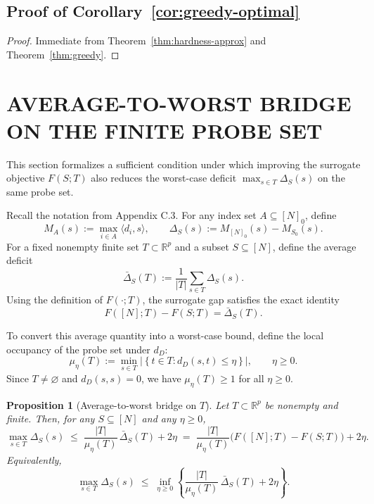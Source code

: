 \documentclass[accepted]{uai2026}
\theoremstyle{plain}
\newtheorem{proposition}[theorem]{Proposition}
\theoremstyle{definition}
\theoremstyle{remark}
\begin{document}

\subsection{Proof of Corollary~\ref{cor:greedy-optimal}}
\label{app:cor4_6}

\begin{proof}
Immediate from Theorem~\ref{thm:hardness-approx} and Theorem~\ref{thm:greedy}.
\end{proof}



\section{AVERAGE-TO-WORST BRIDGE ON THE FINITE PROBE SET}
\label{app:average_worst}


This section formalizes a sufficient condition under which improving the surrogate objective
$F(S;T)$ also reduces the worst-case deficit $\max_{s \in T}\Delta_S(s)$ on the same probe set.

Recall the notation from Appendix C.3. For any index set $A \subseteq [N]_0$, define
\[
M_A(s) := \max_{i \in A}\langle d_i,s\rangle,
\qquad
\Delta_S(s) := M_{[N]_0}(s)-M_{S_0}(s).
\]
For a fixed nonempty finite set $T \subset \mathbb{R}^p$ and a subset $S \subseteq [N]$, define the average deficit
\[
\bar{\Delta}_S(T) := \frac{1}{|T|}\sum_{s \in T}\Delta_S(s).
\]
Using the definition of $F(\cdot;T)$, the surrogate gap satisfies the exact identity
\[
F([N];T)-F(S;T)=\bar{\Delta}_S(T).
\]

To convert this average quantity into a worst-case bound, define the local occupancy of the probe set under $d_D$:
\[
\mu_\eta(T) := \min_{s \in T}\left|\left\{t \in T : d_D(s,t)\le \eta\right\}\right|,
\qquad \eta \ge 0.
\]
Since $T\neq \varnothing$ and $d_D(s,s)=0$, we have $\mu_\eta(T)\ge 1$ for all $\eta\ge 0$.

\begin{proposition}[Average-to-worst bridge on $T$]
\label{prop:avg_to_worst_bridge}
Let $T \subset \mathbb{R}^p$ be nonempty and finite. Then, for any $S \subseteq [N]$ and any $\eta \ge 0$,
\[
\max_{s \in T}\Delta_S(s)
\;\le\;
\frac{|T|}{\mu_\eta(T)}\,\bar{\Delta}_S(T)+2\eta
\;=\;
\frac{|T|}{\mu_\eta(T)}\bigl(F([N];T)-F(S;T)\bigr)+2\eta.
\]
Equivalently,
\[
\max_{s \in T}\Delta_S(s)
\;\le\;
\inf_{\eta \ge 0}
\left\{
\frac{|T|}{\mu_\eta(T)}\,\bar{\Delta}_S(T)+2\eta
\right\}.
\]
\end{proposition}
\end{document}

